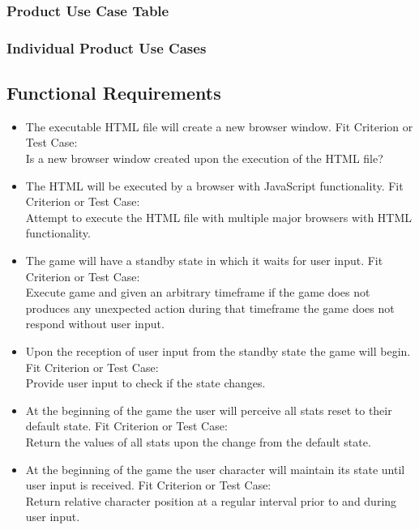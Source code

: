 \documentclass[11pt, oneside]{article}   	%
\begin{document}
\subsubsection*{Product Use Case Table}



\subsubsection*{Individual Product Use Cases}



\subsection*{Functional Requirements}
\begin{itemize}
\item
The executable HTML file will create a new browser window.
\subitem
Fit Criterion or Test Case: \\
Is a new browser window created upon the execution of the HTML file?

\item
The HTML will be executed by a browser with JavaScript functionality.
\subitem
Fit Criterion or Test Case: \\
Attempt to execute the HTML file with multiple major browsers with HTML functionality.

\item
The game will have a standby state in which it waits for user input.
\subitem
Fit Criterion or Test Case: \\
Execute game and given an arbitrary timeframe if the game does not produces any unexpected action during that timeframe the game does not respond without user input.

\item
Upon the reception of user input from the standby state the game will begin.
\subitem
Fit Criterion or Test Case: \\
Provide user input to check if the state changes.

\item
At the beginning of the game the user will perceive all stats reset to their default state.
\subitem
Fit Criterion or Test Case: \\
Return the values of all stats upon the change from the default state.

\item
At the beginning of the game the user character will maintain its state until user input is received.
\subitem
Fit Criterion or Test Case: \\
Return relative character position at a regular interval prior to and during user input.


\end{itemize}
\end{document}

